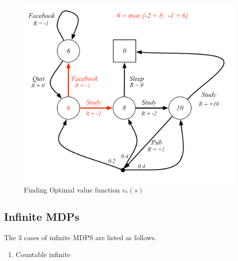 	\begin{figure}[h]
	\centering
	\includegraphics[scale=0.5]{ch2fig7.png}
	\caption{Finding Optimal value function $v_*(s)$}
	\end{figure}

	\subsection{Infinite MDPs}

	The 3 cases of infinite MDPS are listed as follows.
	\begin{enumerate}
	\item Countable infinite
	\end{enumerate}

	
